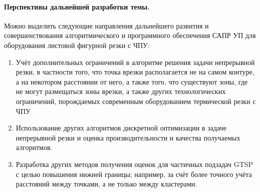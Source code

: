 \paragraph*{Перспективы дальнейшей разработки темы.}
Можно выделить следующие направления дальнейшего развития и совершенствования алгоритмического и
программного обеспечения САПР УП для оборудования листовой фигурной резки с ЧПУ:

\begin{enumerate}
    \item
    Учёт дополнительных ограничений в алгоритме решения задачи
    непрерывной резки, в частности того,
    что точка врезки располагается не на самом контуре,
    а на некотором расстоянии от него, а также того, что
    существуют зоны, где не могут размещаться зоны врезки,
    а также других технологических ограничений,
    порождаемых современным оборудованием термической резки с ЧПУ
    \item
    Использование других алгоритмов дискретной оптимизации в задаче
    непрерывной резки и оценка производительности и качества получаемых
    алгоритмов.
    \item
    Разработка других методов получения оценок для частичных подзадач GTSP
    с целью повышения нижней границы;
    например, за счёт более точного учёта расстояний между точками,
    а не только между кластерами.
\end{enumerate}
